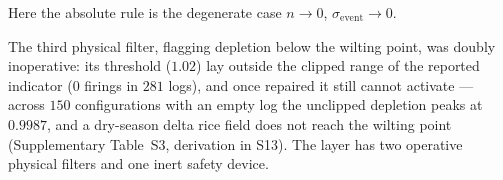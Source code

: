 Here the absolute rule is the degenerate
case $n\to0$, $\sigma_{\mathrm{event}}\to0$.

\begin{remark}
\label{sec:v2reach}
The third physical filter, flagging depletion below the wilting point, was doubly inoperative: its threshold ($1.02$) lay outside the clipped range of the reported indicator ($0$ firings in $281$ logs), and once repaired it still cannot activate --- across $150$ configurations with an empty log the unclipped depletion peaks at $0.9987$, and a dry-season delta rice field does not reach the wilting point (Supplementary Table~S3, derivation in
S13). The layer has two operative physical filters and one inert safety device.
\end{remark}
